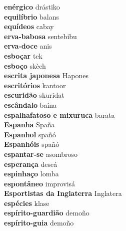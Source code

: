 \textbf{ enérgico  } drástiko \\
\textbf{ equilíbrio  } balans \\
\textbf{ equídeos  } cabay \\
\textbf{ erva-babosa  } sentebibu \\
\textbf{ erva-doce  } anis \\
\textbf{ esboçar  } tek \\
\textbf{ esboço  } skèch \\
\textbf{ escrita japonesa  } Hapones \\
\textbf{ escritórios  } kantoor \\
\textbf{ escuridão  } skuridat \\
\textbf{ escândalo  } baina \\
\textbf{ espalhafatoso e mixuruca  } barata \\
\textbf{ Espanha  } Spaña \\
\textbf{ Espanhol  } spañó \\
\textbf{ Espanhóis  } spañó \\
\textbf{ espantar-se  } asombroso \\
\textbf{ esperança  } deseá \\
\textbf{ espinhaço  } lomba \\
\textbf{ espontâneo  } improvisá \\
\textbf{ Esportistas da Inglaterra  } Inglatera \\
\textbf{ espécies  } klase \\
\textbf{ espírito-guardião  } demoño \\
\textbf{ espírito-guia  } demoño \\
